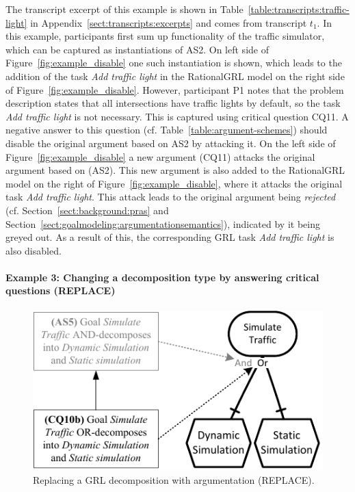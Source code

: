 The transcript excerpt of this example is shown in Table~\ref{table:transcripts:traffic-light} in Appendix~\ref{sect:transcripts:excerpts} and comes from transcript $t_1$. In this example, participants first sum up functionality of the traffic simulator, which can be captured as instantiations of AS2. On left side of Figure~\ref{fig:example_disable} one such instantiation is shown, which leads to the addition of the task \emph{Add traffic light} in the RationalGRL model on the right side of Figure~\ref{fig:example_disable}. However, participant P1 notes that the problem description states that all intersections have traffic lights by default, so the task \emph{Add traffic light} is not necessary. This is captured using critical question CQ11. A negative answer to this question (cf. Table~\ref{table:argument-schemes}) should disable the original argument based on AS2 by attacking it. On the left side of Figure~\ref{fig:example_disable} a new argument (CQ11) attacks the original argument based on (AS2). This new argument is also added to the RationalGRL model on the right of Figure~\ref{fig:example_disable}, where it attacks the original task \emph{Add traffic light}. This attack leads to the original argument being \emph{rejected} (cf. Section~\ref{sect:background:pras} and Section~\ref{sect:goalmodeling:argumentationsemantics}), indicated by it being greyed out. As a result of this, the corresponding GRL task \emph{Add traffic light} is also disabled. 

\paragraph{Example 3: Changing a decomposition type by answering critical questions (\textsf{REPLACE})} 

\begin{figure}[t]
\centering
\includegraphics[]{img/fig_example_replace.pdf}
\caption{Replacing a GRL decomposition with argumentation (\textsf{REPLACE)}.}
\label{fig:examples:decomposition}
\end{figure}

